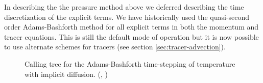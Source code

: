 In describing the the pressure method above we deferred describing the
time discretization of the explicit terms. We have historically used
the quasi-second order Adams-Bashforth method for all explicit terms
in both the momentum and tracer equations. This is still the default
mode of operation but it is now possible to use alternate schemes for
tracers (see section \ref{sec:tracer-advection}).

\begin{figure}
\begin{center}  \end{center}
\caption{
Calling tree for the Adams-Bashforth time-stepping of temperature with
implicit diffusion.
  (,
   )}
\label{fig:call-tree-adams-bashforth}
\end{figure}

